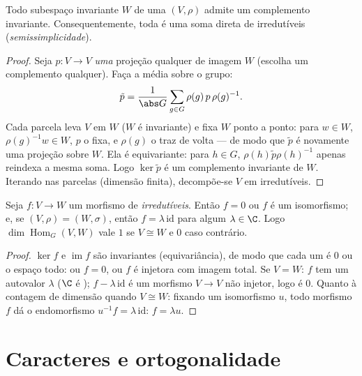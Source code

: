 \begin{theorem}[Maschke]\label{thm:b3:representations:maschke}
Todo subespaço invariante $W$ de uma  $(V, \rho)$ admite um
complemento invariante. Consequentemente, toda  é uma soma
direta de irredutíveis (\emph{semissimplicidade}).
\end{theorem}

\begin{proof}
Seja $p \colon V \to V$ \emph{uma} projeção qualquer de imagem $W$ (escolha um
complemento qualquer). Faça a média sobre o grupo:
\[
\tilde p = \frac1{\abs G}\sum_{g \in G} \rho(g)\,p\,\rho(g)^{-1}.
\]
Cada parcela leva $V$ em $W$ ($W$ é invariante) e fixa $W$
ponto a ponto: para $w \in W$, $\rho(g)^{-1}w \in W$, $p$ o fixa, e $\rho(g)$ o traz de volta
--- de modo que $\tilde p$ é novamente uma projeção sobre $W$. Ela é
equivariante: para $h \in G$, $\rho(h)\tilde p\rho(h)^{-1}$ apenas reindexa a mesma soma. Logo $\ker
\tilde p$
é um complemento invariante de $W$. Iterando nas parcelas (dimensão
finita), decompõe-se $V$ em irredutíveis.
\end{proof}

\begin{theorem}\label{thm:b3:representations:schur}
Seja $f \colon V \to W$ um morfismo de  \emph{irredutíveis}. Então
$f = 0$ ou $f$ é um isomorfismo; e, se $(V,\rho) = (W,\sigma)$, então $f = \lambda\,\mathrm{id}$ para
algum $\lambda \in \C$. Logo $\dim\operatorname{Hom}_G(V, W)$ vale $1$ se $V \cong W$ e $0$ caso
contrário.
\end{theorem}

\begin{proof}
$\ker f$ e $\operatorname{im} f$ são invariantes (equivariância), de modo que cada um
é $0$ ou o espaço todo: ou $f = 0$, ou $f$ é injetora com
imagem total. Se $V = W$: $f$ tem um autovalor $\lambda$ ($\C$ é
); $f - \lambda\,\mathrm{id}$ é um morfismo $V \to V$ não injetor, logo é
$0$. Quanto à contagem de dimensão quando $V \cong W$: fixando um
isomorfismo $u$, todo morfismo $f$ dá o endomorfismo $u^{-1}f = \lambda\,\mathrm{id}$: $f =
\lambda u$.
\end{proof}

\section{Caracteres e ortogonalidade}

